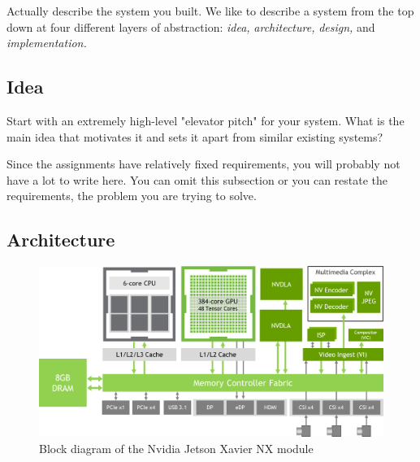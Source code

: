 \documentclass[
	conference,	%
]{IEEEtran}
\newcommand{\newterm}[1]{\textit{#1}}
\begin{document}
Actually describe the system you built.
We like to describe a system from the top down
at four different layers of abstraction:
\newterm{idea,}
\newterm{architecture,}
\newterm{design,}
and
\newterm{implementation.}


\subsection{Idea}
\label{idea}

Start with an extremely high-level "elevator pitch" for your system.
What is the main idea that motivates it and sets it apart from similar
existing systems?

Since the assignments have relatively fixed requirements,
you will probably not have a lot to write here.
You can omit this subsection or you can restate the requirements,
the problem you are trying to solve.

\subsection{Architecture}
\label{architecture}

\begin{figure}[t]
	\includegraphics[width=\columnwidth]{figures/jetson_nx.png}
	\caption{Block diagram of the Nvidia Jetson Xavier NX module}
	\label{jetsonnx_blockdiagram}
\end{figure}
\end{document}
